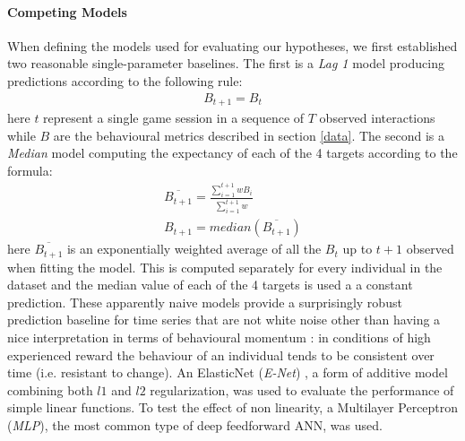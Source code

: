\paragraph{Competing Models}
\label{models}
When defining the models used for evaluating our hypotheses, we first established two reasonable single-parameter baselines. The first is a \textit{Lag 1} model producing predictions according to the following rule:
\begin{equation}
   \begin{gathered}  
     B_{t+1} = B_{t}
     \label{lag_1}
  \end{gathered}
\end{equation}
here $t$ represent a single game session in a sequence of $T$ observed interactions while $B$ are the behavioural metrics described in section \ref{data}. The second is a \textit{Median} model computing the expectancy of each of the 4 targets according to the formula:
\begin{equation}
  \begin{gathered}  
    \overline{B_{t+1}} = \frac
      {\sum_{i=1}^{t+1} wB_{i}}
      {\sum_{i=1}^{t+1} w }\\
    B_{t+1} = median(\overline{B_{t+1}}) 
    \label{median}
  \end{gathered}
\end{equation}
here $\overline{B_{t+1}}$ is an exponentially weighted average of all the $B_t$ up to $t+1$ observed when fitting the model. This is computed separately for every individual in the dataset and the median value of each of the 4 targets is used a a constant prediction. These apparently naive models provide a surprisingly robust prediction baseline for time series that are not white noise \cite{hyndman2018forecasting} other than having a nice interpretation in terms of behavioural momentum \cite{nevin2000behavioral}: in conditions of high experienced reward the behaviour of an individual tends to be consistent over time (i.e. resistant to change). An ElasticNet (\textit{E-Net}) \cite{zou2005regularization}, a form of additive model combining both $l1$ and $l2$ regularization, was used to evaluate the performance of simple linear functions. To test the effect of non linearity, a Multilayer Perceptron (\textit{MLP}), the most common type of deep feedforward ANN, was used. 



